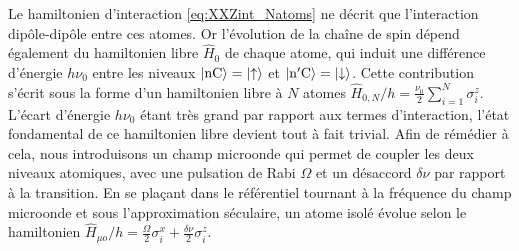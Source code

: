 Le hamiltonien d'interaction \eqref{eq:XXZint_Natoms} ne décrit que l'interaction dipôle-dipôle entre ces atomes.
Or l'évolution de la chaîne de spin dépend également du hamiltonien libre $\hat{H}_0$ de chaque atome, qui induit une différence d'énergie $h\nu_0$ entre les niveaux $\ket{\mathrm{nC}}=\ket{\uparrow}$ et $\ket{\mathrm{n'C}}=\ket{\downarrow}$.
Cette contribution s'écrit sous la forme d'un hamiltonien libre à $N$ atomes $\hat{H}_{0,N}/h = \frac{\nu_0}{2} \sum_{i=1}^{N}\sigma_i^z$.
L'écart d'énergie $h\nu_0$ étant très grand par rapport aux termes d'interaction, l'état fondamental de ce hamiltonien libre devient tout à fait trivial.
Afin de rémédier à cela, nous introduisons un champ microonde qui permet de coupler les deux niveaux atomiques, avec une pulsation de Rabi $\Omega$ et un désaccord $\delta\nu$ par rapport à la transition.
En se plaçant dans le référentiel tournant à la fréquence du champ microonde et sous l'approximation séculaire, un atome isolé évolue selon le hamiltonien 
$\hat{H}_{\mu o}/h = \frac{\Omega}{2}\sigma_i^x + \frac{\delta\nu}{2} \sigma_i^z$.

